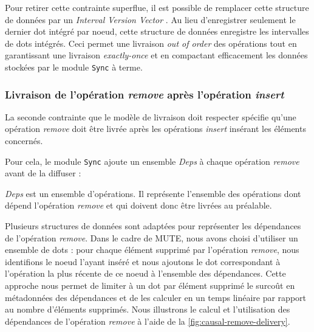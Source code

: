 Pour retirer cette contrainte superflue, il est possible de remplacer cette structure de données par un \emph{Interval Version Vector} \cite{2014-optimized-or-sets}.
Au lieu d'enregistrer seulement le dernier dot intégré par noeud, cette structure de données enregistre les intervalles de dots intégrés.
Ceci permet une livraison \emph{out of order} des opérations tout en garantissant une livraison \emph{exactly-once} et en compactant efficacement les données stockées par le module \texttt{Sync} à terme.

\subsubsection{Livraison de l'opération \emph{remove} après l'opération \emph{insert}}

La seconde contrainte que le modèle de livraison doit respecter spécifie qu'une opération \emph{remove} doit être livrée après les opérations \emph{insert} insérant les éléments concernés.

Pour cela, le module \texttt{Sync} ajoute un ensemble \emph{Deps} à chaque opération \emph{remove} avant de la diffuser :

\begin{definition}[Deps]
  \emph{Deps} est un ensemble d'opérations.
  Il représente l'ensemble des opérations dont dépend l'opération \emph{remove} et qui doivent donc être livrées au préalable.
\end{definition}

Plusieurs structures de données sont adaptées pour représenter les dépendances de l'opération \emph{remove}.
Dans le cadre de MUTE, nous avons choisi d'utiliser un ensemble de dots : pour chaque élément supprimé par l'opération \emph{remove}, nous identifions le noeud l'ayant inséré et nous ajoutons le dot correspondant à l'opération la plus récente de ce noeud à l'ensemble des dépendances.
Cette approche nous permet de limiter à un dot par élément supprimé le surcoût en métadonnées des dépendances et de les calculer en un temps linéaire par rapport au nombre d'éléments supprimés.
Nous illustrons le calcul et l'utilisation des dépendances de l'opération \emph{remove} à l'aide de la \autoref{fig:causal-remove-delivery}.

